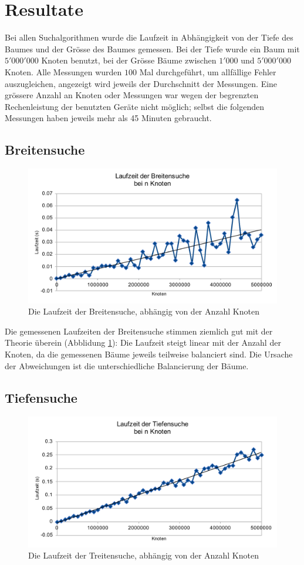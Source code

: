 \documentclass[a4paper,11pt]{article}
\begin{document}
\section{Resultate}
Bei allen Suchalgorithmen wurde die Laufzeit in Abhängigkeit von der Tiefe des Baumes und der Grösse des Baumes gemessen. Bei der Tiefe wurde ein Baum mit $5'000'000$ Knoten benutzt, bei der Grösse Bäume zwischen $1'000$ und $5'000'000$ Knoten. Alle Messungen wurden $100$ Mal durchgeführt, um allfällige Fehler auszugleichen, angezeigt wird jeweils der Durchschnitt der Messungen. Eine grössere Anzahl an Knoten oder Messungen war wegen der begrenzten Rechenleistung der benutzten Geräte nicht möglich; selbst die folgenden Messungen haben jeweils mehr als 45 Minuten gebraucht.

\subsection{Breitensuche}
	\begin{figure}[ht]
		\centering
		\includegraphics[width=0.85\linewidth]{img/BFS_size.pdf}
		\caption{Die Laufzeit der Breitensuche, abhängig von der Anzahl Knoten}
		\label{fig:bfs_time}
	\end{figure}
	
Die gemessenen Laufzeiten der Breitensuche stimmen ziemlich gut mit der Theorie überein (Abblidung \ref{fig:bfs_time}): Die Laufzeit steigt linear mit der Anzahl der Knoten, da die gemessenen Bäume jeweils teilweise balanciert sind. Die Ursache der Abweichungen ist die unterschiedliche Balancierung der Bäume.
\subsection{Tiefensuche}

	\begin{figure}[ht]
		\centering
		\includegraphics[width=0.85\linewidth]{img/DFS_size.pdf}
		\caption{Die Laufzeit der Treitensuche, abhängig von der Anzahl Knoten}
		\label{fig:dfs_time}
	\end{figure}
	
\end{document}
